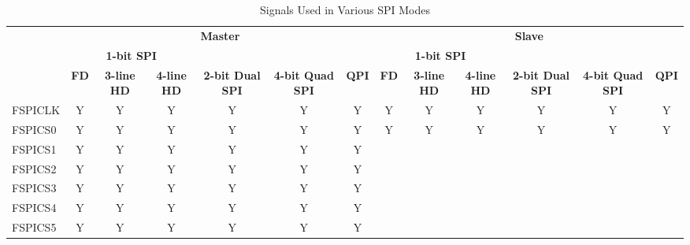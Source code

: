 \documentclass[main\_\_EN.tex]{subfiles}
\begin{document}
\begin{landscape}
\begin{table}[H]
    \centering
    \caption{Signals Used in Various SPI Modes}
    \label{tab:singals-used-in-various-spi-modes}

    \begin{threeparttable}
    \begin{tabular}{ |p{2.0cm} |c|c|c|c|c|c|c|c|c|c|c|c| }
    \hline
        \rowcolor{lightgray}
        & \multicolumn{6}{c|}{\textbf{Master}} & \multicolumn{6}{c|}{\textbf{Slave}} \\\cline{2-13}
        \rowcolor{lightgray}
        & \multicolumn{3}{c|}{\textbf{1-bit SPI}} & & & & \multicolumn{3}{c|}{\textbf{1-bit SPI}} & & & \\ \cline{2-4} \cline{8-10}
        \rowcolor{lightgray}
        \multirow{-3}{*}{\textbf{FSPI Signal}} & \textbf{FD\tnote{1}} & \textbf{3-line HD\tnote{2}} & \textbf{4-line HD} & \multirow{-2}{*}{\textbf{2-bit Dual SPI}} & \multirow{-2}{*}{\textbf{4-bit Quad SPI}} & \multirow{-2}{*}{\textbf{QPI}} & \textbf{FD} & \textbf{3-line HD} & \textbf{4-line HD} & \multirow{-2}{*}{\textbf{2-bit Dual SPI}} & \multirow{-2}{*}{\textbf{4-bit Quad SPI}} & \multirow{-2}{*}{\textbf{QPI}} \\ \hline
FSPICLK                  & Y       & Y       & Y       & Y       & Y       & Y      & Y       & Y      & Y       & Y       & Y       & Y      \\ \hline
FSPICS0                  & Y       & Y       & Y       & Y       & Y       & Y      & Y       & Y      & Y       & Y       & Y       & Y      \\ \hline
FSPICS1                  & Y       & Y       & Y       & Y       & Y       & Y      &         &        &         &         &         &        \\ \hline
FSPICS2                  & Y       & Y       & Y       & Y       & Y       & Y      &         &        &         &         &         &        \\ \hline
FSPICS3                  & Y       & Y       & Y       & Y       & Y       & Y      &         &        &         &         &         &        \\ \hline
FSPICS4                  & Y       & Y       & Y       & Y       & Y       & Y      &         &        &         &         &         &        \\ \hline
FSPICS5                  & Y       & Y       & Y       & Y       & Y       & Y      &         &        &         &         &         &        \\ \hline

\end{tabular}
\end{threeparttable}
\end{table}
\end{landscape}
\end{document}
